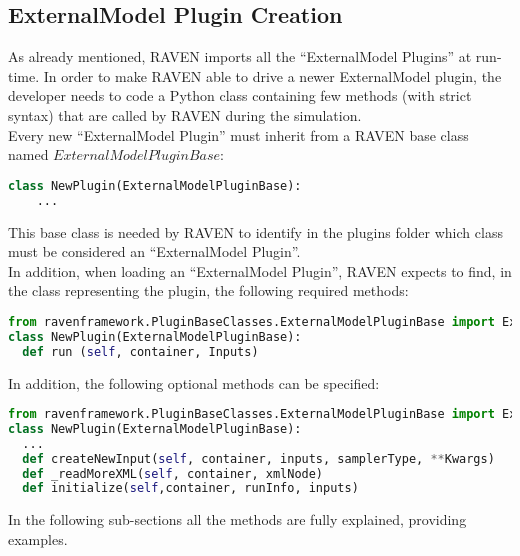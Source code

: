 \subsection{ExternalModel Plugin Creation}
\label{subsec:externalModelPluginCreation}
As already mentioned, RAVEN imports all the ``ExternalModel Plugins'' at run-time.
In order to make RAVEN
able to drive a newer ExternalModel plugin, the developer needs to code a Python class
containing few methods (with strict syntax) that are called by RAVEN during the simulation.
\\ Every new ``ExternalModel Plugin'' must inherit from a RAVEN base class named
$ExternalModelPluginBase$:
\begin{lstlisting}[language=python]
  class NewPlugin(ExternalModelPluginBase):
    ...
\end{lstlisting}
This base class is needed by RAVEN to identify in the plugins folder which class must
be considered an  ``ExternalModel Plugin''.
\\ In addition, when loading an ``ExternalModel Plugin'', RAVEN expects to find, in the class representing the plugin,
 the following required methods:
\begin{lstlisting}[language=python, basicstyle=\scriptsize\ttfamily, breaklines=True, columns=fullflexible]
from ravenframework.PluginBaseClasses.ExternalModelPluginBase import ExternalModelPluginBase
class NewPlugin(ExternalModelPluginBase):
  def run (self, container, Inputs)
\end{lstlisting}
In addition, the following optional methods can be specified:
\begin{lstlisting}[language=python, basicstyle=\scriptsize\ttfamily, breaklines=True, columns=fullflexible]
from ravenframework.PluginBaseClasses.ExternalModelPluginBase import ExternalModelPluginBase
class NewPlugin(ExternalModelPluginBase):
  ...
  def createNewInput(self, container, inputs, samplerType, **Kwargs)
  def _readMoreXML(self, container, xmlNode)
  def initialize(self,container, runInfo, inputs)
\end{lstlisting}
In the following sub-sections all the methods are fully explained, providing examples.
